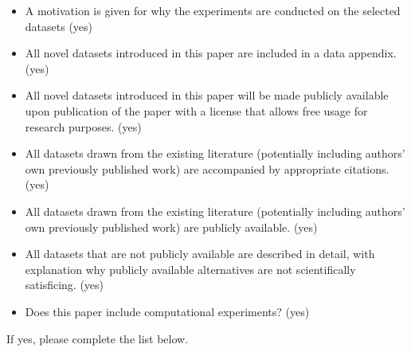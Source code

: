 \begin{itemize}
\item A motivation is given for why the experiments are conducted on the selected datasets (yes)
\item All novel datasets introduced in this paper are included in a data appendix. (yes)
\item All novel datasets introduced in this paper will be made publicly available upon publication of the paper with a license that allows free usage for research purposes. (yes)
\item All datasets drawn from the existing literature (potentially including authors’ own previously published work) are accompanied by appropriate citations. (yes)
\item All datasets drawn from the existing literature (potentially including authors’ own previously published work) are publicly available. (yes)
\item All datasets that are not publicly available are described in detail, with explanation why publicly available alternatives are not scientifically satisficing. (yes)
\item Does this paper include computational experiments? (yes)
\end{itemize}

If yes, please complete the list below.

